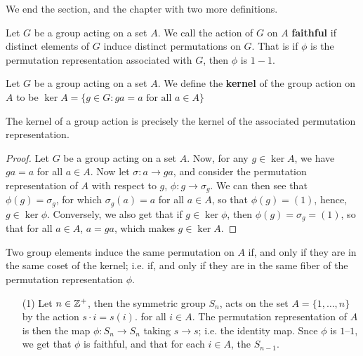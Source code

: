 We end the section, and the chapter with two more definitions.

\begin{definition}
    Let $G$ be a group acting on a set $A$. We call the action of $G$ on  $A$
     \textbf{faithful} if distinct elements of $G$ induce distinct permutations
     on  $G$. That is if $\phi$ is the permutation representation associated
     with  $G$, then  $\phi$ is  $1-1$.
\end{definition}

\begin{definition}
    Let $G$ be a group acting on a set $A$. We define the \textbf{kernel} of the
    group action on $A$ to be  $\ker{A}=\{g \in G : ga=a \text{ for all } a \in
    A\}$
\end{definition}

\begin{lemma}\label{4.1.2}
    The kernel of a group action is precisely the kernel of the associated
    permutation representation.
\end{lemma}
\begin{proof}
    Let $G$ be a group acting on a set  $A$. Now, for any  $g \in \ker{A}$, we
    have $ga=a$ for all  $a \in A$. Now let $\sigma:a \rightarrow ga$, and
    consider the permutation representation of $A$ with respect to  $g$,
    $\phi:g \rightarrow \sigma_g$. We can then see that $\phi(g)=\sigma_g$,
    for which $\sigma_g(a)=a$ for all $a \in A$, so that  $\phi(g)=(1)$, hence,
    $g \in \ker{\phi}$. Conversely, we also get that if $g \in \ker{\phi}$, then
    $\phi(g)=\sigma_g=(1)$, so that for all $a \in A$, $a=ga$, which makes  $g
    \in \ker{A}$.
\end{proof}
\begin{corollary}
    Two group elements induce the same permutation on $A$ if, and only if they
    are in the same coset of the kernel; i.e. if, and only if they are in the
    same fiber of the permutation representation $\phi$.
\end{corollary}

\begin{example}\label{4.2}
    \begin{enumerate}
        \item[(1)] Let $n \in \mathbb{Z}^+$, then the symmetric group $S_n$, acts on the
            set $A=\{1, \dots, n\}$ by the action $s \cdot i=s(i)$. for all $i
            \in A$. The permutation representation of $A$ is then the map
            $\phi:S_n \rightarrow S_n$ taking $s \rightarrow s$; i.e. the
            identity map. Snce $\phi$ is  $1$--$1$, we get that $\phi$ is
            faithful, and that for each $i \in A$, the  \simeq
            $S_{n-1}$.
    \end{enumerate}
\end{example}
